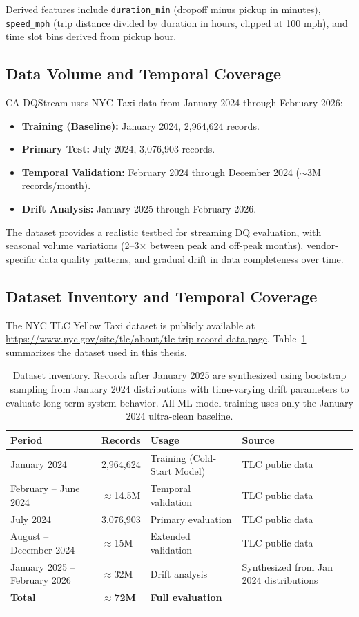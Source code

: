 Derived features include \texttt{duration\_min} (dropoff minus pickup in minutes), \texttt{speed\_mph} (trip distance divided by duration in hours, clipped at 100 mph), and time slot bins derived from pickup hour.

\subsection{Data Volume and Temporal Coverage}

CA-DQStream uses NYC Taxi data from January 2024 through February 2026:

\begin{itemize}
    \item \textbf{Training (Baseline):} January 2024, 2,964,624 records.
    \item \textbf{Primary Test:} July 2024, 3,076,903 records.
    \item \textbf{Temporal Validation:} February 2024 through December 2024 ($\sim$3M records/month).
    \item \textbf{Drift Analysis:} January 2025 through February 2026.
\end{itemize}

The dataset provides a realistic testbed for streaming DQ evaluation, with seasonal volume variations (2--3$\times$ between peak and off-peak months), vendor-specific data quality patterns, and gradual drift in data completeness over time.

\subsection*{Dataset Inventory and Temporal Coverage}

The NYC TLC Yellow Taxi dataset is publicly available at \url{https://www.nyc.gov/site/tlc/about/tlc-trip-record-data.page}. Table~\ref{tab:dataset_inventory} summarizes the dataset used in this thesis.

\begin{longtable}{|m{3cm}|m{3cm}|m{2cm}|m{5cm}|}
\hline
\textbf{Period} & \textbf{Records} & \textbf{Usage} & \textbf{Source} \\ \hline
January 2024 & 2,964,624 & Training (Cold-Start Model) & TLC public data \\ \hline
February -- June 2024 & $\approx$14.5M & Temporal validation & TLC public data \\ \hline
July 2024 & 3,076,903 & Primary evaluation & TLC public data \\ \hline
August -- December 2024 & $\approx$15M & Extended validation & TLC public data \\ \hline
January 2025 -- February 2026 & $\approx$32M & Drift analysis & Synthesized from Jan 2024 distributions \\ \hline
\textbf{Total} & \textbf{$\approx$72M} & \textbf{Full evaluation} & \\ \hline
\caption{Dataset inventory. Records after January 2025 are synthesized using bootstrap sampling from January 2024 distributions with time-varying drift parameters to evaluate long-term system behavior. All ML model training uses only the January 2024 ultra-clean baseline.}
\label{tab:dataset_inventory}
\end{longtable}

